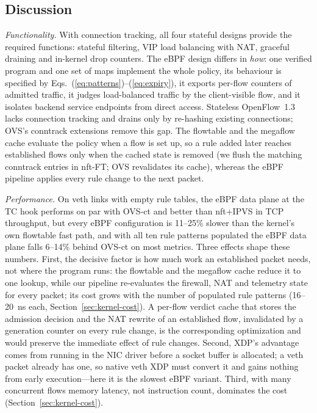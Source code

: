 \documentclass[conference]{IEEEtran}
\begin{document}
\subsection{Discussion}
\textit{Functionality.} With connection tracking, all four stateful designs
provide the required functions: stateful filtering, VIP load balancing with
NAT, graceful draining and in-kernel drop counters. The eBPF design differs in
\emph{how}: one verified program and one set of maps implement the whole
policy, its behaviour is specified by
Eqs.~(\ref{eq:patterns})--(\ref{eq:expiry}), it exports per-flow counters of
admitted traffic, it judges load-balanced traffic by the client-visible flow,
and it isolates backend service endpoints from direct access. Stateless
OpenFlow~1.3 lacks connection tracking and drains only by re-hashing existing
connections; OVS's conntrack extensions remove this gap. The flowtable and
the megaflow cache evaluate the policy when a flow is set up, so a rule added
later reaches established flows only when the cached state is removed (we
flush the matching conntrack entries in nft-FT; OVS revalidates its cache),
whereas the eBPF pipeline applies every rule change to the next packet.

\textit{Performance.} On veth links with empty rule tables, the eBPF data
plane at the TC hook performs on par with OVS-ct and better than nft+IPVS in
TCP throughput, but every eBPF configuration is 11--25\% slower than the
kernel's own flowtable fast path, and with all ten rule patterns populated the
eBPF data plane falls 6--14\% behind OVS-ct on most metrics. Three effects shape these
numbers. First, the decisive factor is how much work an established packet
needs, not where the program runs: the flowtable and the megaflow cache
reduce it to one lookup, while our pipeline re-evaluates the firewall, NAT
and telemetry state for every packet; its cost grows with the number of
populated rule patterns (16--20~ns each, Section~\ref{sec:kernel-cost}). A
per-flow verdict cache that stores the admission decision and the NAT
rewrite of an established flow, invalidated by a generation counter on every
rule change, is the corresponding optimization and would preserve the
immediate effect of rule changes. Second, XDP's advantage comes from running
in the NIC driver before a socket buffer is allocated; a veth packet already
has one, so native veth XDP must convert it and gains nothing from early
execution---here it is the slowest eBPF variant. Third, with many concurrent
flows memory latency, not instruction count, dominates the cost
(Section~\ref{sec:kernel-cost}).
\end{document}
